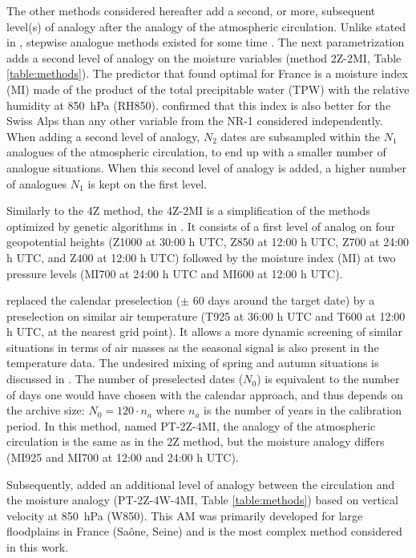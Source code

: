 \documentclass{ametsoc}
\begin{document}
The other methods considered hereafter add a second, or more, subsequent level(s) of analogy after the analogy of the atmospheric circulation. Unlike stated in \citet{Caillouet2016}, stepwise analogue methods existed for some time \citep[e.g.][]{Bontron2004, Bontron2005, Marty2010, Marty2012, Horton2012a}. The next parametrization adds a second level of analogy on the moisture variables (method 2Z-2MI, Table \ref{table:methods}). The predictor that \citet{Bontron2004} found optimal for France is a moisture index (MI) made of the product of the total precipitable water (TPW) with the relative humidity at 850~hPa (RH850). \cite{Horton2012a} confirmed that this index is also better for the Swiss Alps than any other variable from the NR-1 considered independently. When adding a second level of analogy, $N_{2}$ dates are subsampled within the $N_{1}$ analogues of the atmospheric circulation, to end up with a smaller number of analogue situations. When this second level of analogy is added, a higher number of analogues $N_{1}$ is kept on the first level. 

Similarly to the 4Z method, the 4Z-2MI is a simplification of the methods optimized by genetic algorithms in \citet{Horton2017b}. It consists of a first level of analog on four geopotential heights (Z1000 at 30:00 h UTC, Z850 at 12:00 h UTC, Z700 at 24:00 h UTC, and Z400 at 12:00 h UTC) followed by the moisture index (MI) at two pressure levels (MI700 at 24:00 h UTC and MI600 at 12:00 h UTC).

\citet{BenDaoud2016} replaced the calendar preselection ($\pm$ 60 days around the target date) by a preselection on similar air temperature (T925 at 36:00 h UTC and T600 at 12:00 h UTC, at the nearest grid point). It allows a more dynamic screening of similar situations in terms of air masses as the seasonal signal is also present in the temperature data. The undesired mixing of spring and autumn situations is discussed in \citet{Caillouet2016}. The number of preselected dates ($N_{0}$) is equivalent to the number of days one would have chosen with the calendar approach, and thus depends on the archive size: $N_{0} = 120 \cdot n_{a}$ where $n_{a}$ is the number of years in the calibration period. In this method, named PT-2Z-4MI, the analogy of the atmospheric circulation is the same as in the 2Z method, but the moisture analogy differs (MI925 and MI700 at 12:00 and 24:00 h UTC).

Subsequently, \citet{BenDaoud2016} added an additional level of analogy between the circulation and the moisture analogy (PT-2Z-4W-4MI, Table \ref{table:methods}) based on vertical velocity at 850~hPa (W850). This AM was primarily developed for large floodplains in France (Sa\^{o}ne, Seine) and is the most complex method considered in this work. 
\end{document}
